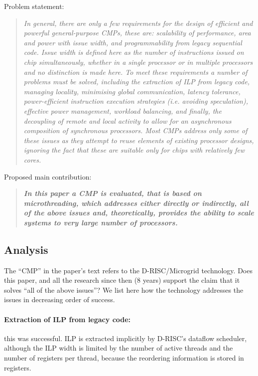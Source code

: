 Problem statement:
\begin{quote}\itshape
In general, there are only a few requirements for the design of
efficient and powerful general-purpose CMPs, these are: scalability of
performance, area and power with issue width, and programmability from
legacy sequential code. Issue width is defined here as the number of
instructions issued on chip simultaneously, whether in a single
processor or in multiple processors and no distinction is made
here. To meet these requirements a number of problems must be solved,
including the extraction of ILP from legacy code, managing locality,
minimising global communication, latency tolerance, power-efficient
instruction execution strategies (i.e. avoiding speculation),
effective power management, workload balancing, and finally, the
decoupling of remote and local activity to allow for an asynchronous
composition of synchronous processors. Most CMPs address only some of
these issues as they attempt to reuse elements of existing processor
designs, ignoring the fact that these are suitable only for chips with
relatively few cores.
\end{quote}

Proposed main contribution:
\begin{quote}
\bfseries\itshape
In this paper a CMP is evaluated, that is based on microthreading, which addresses either directly or indirectly, all of the above issues and, theoretically, provides the ability to scale systems to very large number of processors.
\end{quote}

\subsection{Analysis}

The ``CMP'' in the paper's text refers to the D-RISC/Microgrid technology. Does this paper, and all the research
since then (8 years) support the claim that it solves ``all of the above issues''?
We list here how the technology addresses the issues in decreasing order of success.

\paragraph{Extraction of ILP from legacy code:} this was successful. ILP is extracted implicitly by D-RISC's dataflow scheduler, although
the ILP width is limited by the number of active threads and the number of registers per thread, because the reordering
information is stored in registers.

